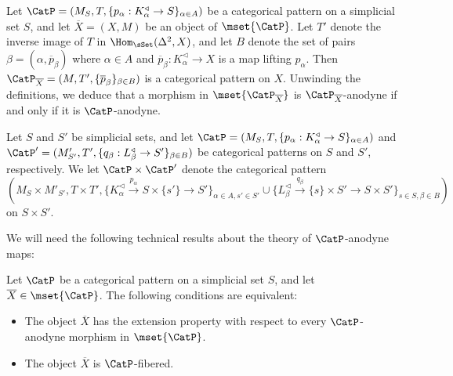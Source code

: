 \begin{remark}\label{stouffer}
Let $\CatP = (M_S, T, \{ p_{\alpha}: K_{\alpha}^{\triangleleft} \rightarrow S\}_{\alpha \in A})$
be a categorical pattern on a simplicial set $S$, and let $\overline{X} = (X,M)$ be an object of $\mset{ \CatP}$. Let $T'$ denote the inverse image of $T$ in $\Hom_{ \sSet}( \Delta^2, X)$, and let
$B$ denote the set of pairs $\beta = (\alpha, \overline{p}_{\beta})$ where $\alpha \in A$ and
$\overline{p}_{\beta}: K_{\alpha}^{\triangleleft} \rightarrow X$ is a map lifting $p_{\alpha}$.
Then $\CatP_{ \overline{X} } = ( M, T', \{ \overline{p}_{\beta} \}_{ \beta \in B} )$ is a categorical
pattern on $X$. Unwinding the definitions, we deduce that a morphism in
$\mset{ \CatP_{ \overline{X} }}$ is $\CatP_{\overline{X}}$-anodyne if and only if it is
$\CatP$-anodyne.
\end{remark}


\begin{definition}\label{prodpat}
Let $S$ and $S'$ be simplicial sets, and let
$\CatP = (M_S, T, \{ p_{\alpha}: K_{\alpha}^{\triangleleft} \rightarrow S\}_{\alpha \in A})$
and $\CatP' = (M'_{S'}, T', \{ q_{\beta}: L_{\beta}^{\triangleleft} \rightarrow S'\}_{\beta \in B})$
be categorical patterns on $S$ and $S'$, respectively. We let
$\CatP \times \CatP'$ denote the categorical pattern
$$ (M_S \times M'_{S'}, T \times T', \{ K_{\alpha}^{\triangleleft}
\stackrel{p_{\alpha}}{\rightarrow} S \times \{s'\} \rightarrow S' \}_{\alpha \in A, s' \in S'}
\cup \{ L_{\beta}^{\triangleleft} \stackrel{q_{\beta}}{\rightarrow} \{s\} \times S'
\rightarrow S \times S' \}_{s \in S, \beta \in B} )$$
on $S \times S'$.
\end{definition}

We will need the following technical results about the theory of 
$\CatP$-anodyne maps:

\begin{proposition}\label{poststaf}
Let $\CatP$ be a categorical pattern on a simplicial set $S$, and let $\overline{X} \in \mset{ \CatP}$. 
The following conditions are equivalent:
\begin{itemize}
\item[$(1)$] The object $\overline{X}$ has the extension property with respect to every
$\CatP$-anodyne morphism in $\mset{ \CatP}$.
\item[$(2)$] The object $\overline{X}$ is $\CatP$-fibered.
\end{itemize}
\end{proposition}

